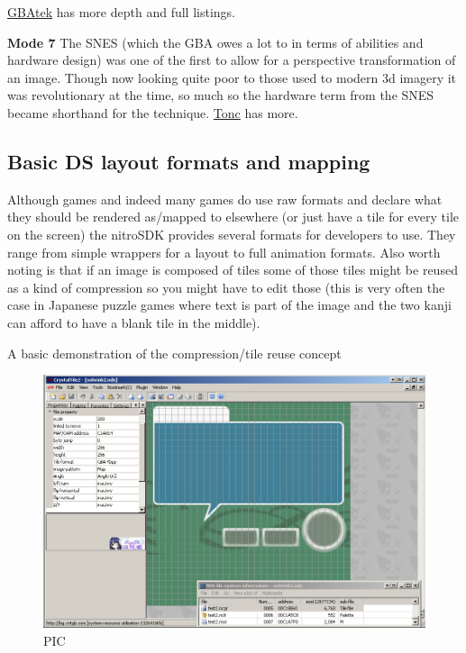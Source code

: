 \documentclass[
]{book}
\begin{document}
\href{http://problemkaputt.de/gbatek.htm\#lcdiocolorspecialeffects}{GBAtek} has more depth and full listings.

\textbf{Mode 7} The SNES (which the GBA owes a lot to in terms of abilities and hardware design) was one of the first to allow for a perspective transformation of an image. Though now looking quite poor to those used to modern 3d imagery it was revolutionary at the time, so much so the hardware term from the SNES became shorthand for the technique. \href{http://www.coranac.com/tonc/text/mode7.htm}{Tonc} has more.

\hypertarget{basic-ds-layout-formats-and-mapping}{%
\subsection{Basic DS layout formats and mapping}\label{basic-ds-layout-formats-and-mapping}}

Although games and indeed many games do use raw formats and declare what they should be rendered as/mapped to elsewhere (or just have a tile for every tile on the screen) the nitroSDK provides several formats for developers to use. They range from simple wrappers for a layout to full animation formats. Also worth noting is that if an image is composed of tiles some of those tiles might be reused as a kind of compression so you might have to edit those (this is very often the case in Japanese puzzle games where text is part of the image and the two kanji can afford to have a blank tile in the middle).

A basic demonstration of the compression/tile reuse concept

\begin{figure}
\centering
\includegraphics{images/54_home_fast6191_romhackingguide_unrenamed_file___ginal_borders_3wizardozndsdemohack13jul2011.png}
\caption{PIC}
\end{figure}
\end{document}
